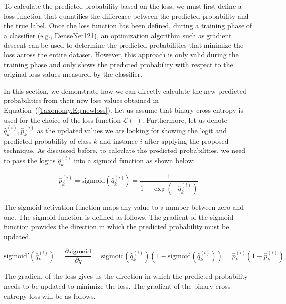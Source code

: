 To calculate the predicted probability based on the loss, we must first define a loss function that quantifies the difference between the predicted probability and the true label. Once the loss function has been defined, during a training phase of a classifier (e.g., DenseNet121), an optimization algorithm such as gradient descent can be used to determine the predicted probabilities that minimize the loss across the entire dataset. However, this approach is only valid during the training phase and only shows the predicted probability with respect to the original loss values measured by the classifier.

In this section, we demonstrate how we can directly calculate the new predicted probabilities from their new loss values obtained in Equation~(\ref{Taxonomy.Eq.newloss}). Let us assume that binary cross entropy is used for the choice of the loss function $\mathcal{L}(\cdot) $. Furthermore, let us denote $\widehat{q}_k^{(i)} , \widehat{p}_k^{(i)} $ as the updated values we are looking for showing the logit and predicted probability of class $k $ and instance $i $ after applying the proposed technique. As discussed before, to calculate the predicted probabilities, we need to pass the logits ${\widehat q}_k^{(i)} $ into a sigmoid function as shown below:

\begin{equation}
    \label{Taxonomy.Eq.9.sigmoid}
    \widehat{p}_k^{(i)}=\text{sigmoid}\left(\widehat{q}_k^{(i)}\right)=\frac1{1+\exp\left(-\widehat{q}_k^{(i)}\right)}
\end{equation}


The sigmoid activation function maps any value to a number between zero and one. The sigmoid function is defined as follows. The gradient of the sigmoid function provides the direction in which the predicted probability must be updated.

\begin{equation}
    \label{Taxonomy.Eq.10.SigmoidPrime}
    \text{sigmoid}'\left(\widehat{q}_k^{(i)}\right)=\frac{\partial{\text{sigmoid}}}{\partial{q}}=\text{sigmoid}\left(\widehat{q}_k^{(i)}\right)\left(1-\text{sigmoid}\left(\widehat{q}_k^{(i)}\right)\right)=\widehat{p}_k^{(i)}\left(1-\widehat{p}_k^{(i)}\right)
\end{equation}


The gradient of the loss gives us the direction in which the predicted probability needs to be updated to minimize the loss. The gradient of the binary cross entropy loss will be as follows.


